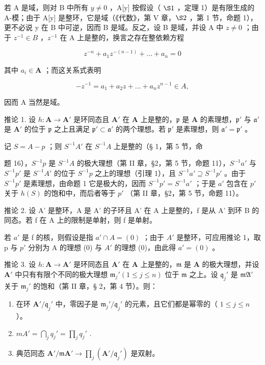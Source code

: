 若 A 是域，则对 B 中所有 \(y \neq 0\) ，A[y] 按假设（ \(\S 1\) ，定理 1）是有限生成的 A-模；由于 A[y] 是整环，它是域（《代数》，第 V 章，\(\S 2\) ，第 1 节，命题 1），更不必说 y 在 B 中可逆，因而 B 是域。反之，设 B 是域，并设 A 中 \(z \neq 0\) ；由于 \(z^{-1} \in B\) ，\(z^{-1}\) 在 A 上是整的，换言之存在整依赖方程

\[
z ^ {- n} + a _ {1} z ^ {- (n - 1)} + \dots + a _ {n} = 0
\]

其中 \(a_{i} \in \mathbf{A}\) ；而这关系式表明

\[
- z ^ {- 1} = a _ {1} + a _ {2} z + \dots + a _ {n} z ^ {n - 1} \in A,
\]

因而 A 当然是域。

推论 1. 设 \(h: \mathbf{A} \to \mathbf{A}'\) 是环同态且 \(\mathbf{A}'\) 在 \(\mathbf{A}\) 上是整的，\(\mathfrak{p}\) 是 \(\mathbf{A}\) 的素理想，\(\mathfrak{p}'\) 与 \(\mathfrak{a}'\) 是 \(\mathbf{A}'\) 的位于 \(\mathfrak{p}\) 之上且满足 \(\mathfrak{p}' \subset \mathfrak{a}'\) 的两个理想。若 \(\mathfrak{p}'\) 是素理想，则 \(\mathfrak{a}' = \mathfrak{p}'\) 。

记 \(S = A - p\) ；则 \(S^{-1}A'\) 在 \(S^{-1}A\) 上是整的（§ 1，第 5 节，命

题 16），\(S^{-1}p\) 是 \(S^{-1}A\) 的极大理想（第 II 章，§2，第 5 节，命题 11），\(S^{-1}a'\) 与 \(S^{-1}p'\) 是 \(S^{-1}A'\) 的位于 \(S^{-1}p\) 之上的理想（引理 1），且 \(S^{-1}a' \supseteq S^{-1}p'\) 。由于 \(S^{-1}p'\) 是素理想，由命题 1 它是极大的，因而 \(S^{-1}p' = S^{-1}a'\) ；于是 \(a'\) 包含在 \(p'\) 关于 \(h(S)\) 的饱和中，而后者等于 \(p'\) （第 II 章，§2，第 5 节，命题 11）。

推论 2. 设 A' 是整环，A 是 A' 的子环且 A' 在 A 上是整的，f 是从 A' 到环 B 的同态。若 f 在 A 上的限制是单射，则 f 是单射。

若 \(a'\) 是 f 的核，则假设是指 \(a' \cap A = (0)\) ；由于 \(A'\) 是整环，可应用推论 1，取 p 与 \(p'\) 分别为 A 的理想 (0) 与 \(A'\) 的理想 (0)，由此得 \(a' = (0)\) 。

推论 3. 设 \(h: \mathbf{A} \to \mathbf{A}'\) 是环同态且 \(\mathbf{A}'\) 在 \(\mathbf{A}\) 上是整的，\(\mathfrak{m}\) 是 \(\mathbf{A}\) 的极大理想，并设 \(\mathbf{A}'\) 中只有有限个不同的极大理想 \(\mathfrak{m}_j' (1 \leqslant j \leqslant n)\) 位于 \(\mathfrak{m}\) 之上。设 \(\mathfrak{q}_j'\) 是 \(\mathfrak{mA}'\) 关于 \(\mathfrak{m}_j'\) 的饱和（第 II 章，§ 2，第 4 节）。则：

\begin{enumerate}
\def\labelenumi{(\roman{enumi})}
\item
  在环 \(\mathbf{A}' / \mathfrak{q}_j'\) 中，零因子是 \(\mathfrak{m}_j' / \mathfrak{q}_j'\) 的元素，且它们都是幂零的（ \(1 \leqslant j \leqslant n\) ）。
\item
  \(mA' = \bigcap_{j} q_{j}' = \prod_{j} q_{j}'\) .
\item
  典范同态 \(\mathbf{A}' / \mathfrak{m}\mathbf{A}' \to \prod_j (\mathbf{A}' / \mathfrak{q}_j')\) 是双射。
\end{enumerate}

